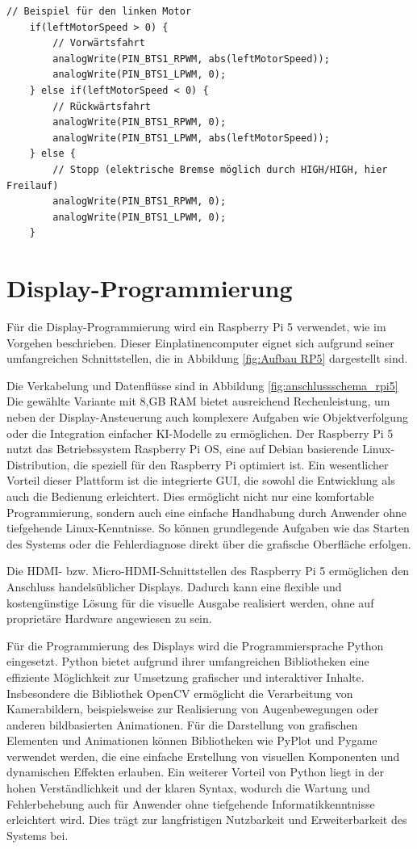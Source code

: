 \begin{lstlisting}[style=motorStyle, caption={Ansteuerung der H-Brücke}]
	// Beispiel für den linken Motor
	if(leftMotorSpeed > 0) {
		// Vorwärtsfahrt
		analogWrite(PIN_BTS1_RPWM, abs(leftMotorSpeed)); 
		analogWrite(PIN_BTS1_LPWM, 0);
	} else if(leftMotorSpeed < 0) {
		// Rückwärtsfahrt
		analogWrite(PIN_BTS1_RPWM, 0);
		analogWrite(PIN_BTS1_LPWM, abs(leftMotorSpeed));
	} else {
		// Stopp (elektrische Bremse möglich durch HIGH/HIGH, hier Freilauf)
		analogWrite(PIN_BTS1_RPWM, 0);
		analogWrite(PIN_BTS1_LPWM, 0);
	}
\end{lstlisting}

\clearpage

\section{Display-Programmierung}
\label{cha:Display-Programmierung}

Für die Display-Programmierung wird ein Raspberry Pi 5 verwendet, wie im Vorgehen beschrieben. Dieser Einplatinencomputer eignet sich aufgrund seiner umfangreichen Schnittstellen, die in Abbildung \ref{fig:Aufbau RP5} dargestellt sind. 

Die Verkabelung und Datenflüsse sind in Abbildung \ref{fig:anschlussschema_rpi5}
Die gewählte Variante mit 8,GB RAM bietet ausreichend Rechenleistung, um neben der Display-Ansteuerung auch komplexere Aufgaben wie Objektverfolgung oder die Integration einfacher KI-Modelle zu ermöglichen.
Der Raspberry Pi 5 nutzt das Betriebssystem Raspberry Pi OS, eine auf Debian basierende Linux-Distribution, die speziell für den Raspberry Pi optimiert ist. Ein wesentlicher Vorteil dieser Plattform ist die integrierte GUI, die sowohl die Entwicklung als auch die Bedienung erleichtert. Dies ermöglicht nicht nur eine komfortable Programmierung, sondern auch eine einfache Handhabung durch Anwender ohne tiefgehende Linux-Kenntnisse. So können grundlegende Aufgaben wie das Starten des Systems oder die Fehlerdiagnose direkt über die grafische Oberfläche erfolgen.


Die HDMI- bzw. Micro-HDMI-Schnittstellen des Raspberry Pi 5 ermöglichen den Anschluss handelsüblicher Displays. Dadurch kann eine flexible und kostengünstige Lösung für die visuelle Ausgabe realisiert werden, ohne auf proprietäre Hardware angewiesen zu sein.

Für die Programmierung des Displays wird die Programmiersprache Python eingesetzt. Python bietet aufgrund ihrer umfangreichen Bibliotheken eine effiziente Möglichkeit zur Umsetzung grafischer und interaktiver Inhalte. Insbesondere die Bibliothek OpenCV ermöglicht die Verarbeitung von Kamerabildern, beispielsweise zur Realisierung von Augenbewegungen oder anderen bildbasierten Animationen. Für die Darstellung von grafischen Elementen und Animationen können Bibliotheken wie PyPlot und Pygame verwendet werden, die eine einfache Erstellung von visuellen Komponenten und dynamischen Effekten erlauben. Ein weiterer Vorteil von Python liegt in der hohen Verständlichkeit und der klaren Syntax, wodurch die Wartung und Fehlerbehebung auch für Anwender ohne tiefgehende Informatikkenntnisse erleichtert wird. Dies trägt zur langfristigen Nutzbarkeit und Erweiterbarkeit des Systems bei.

